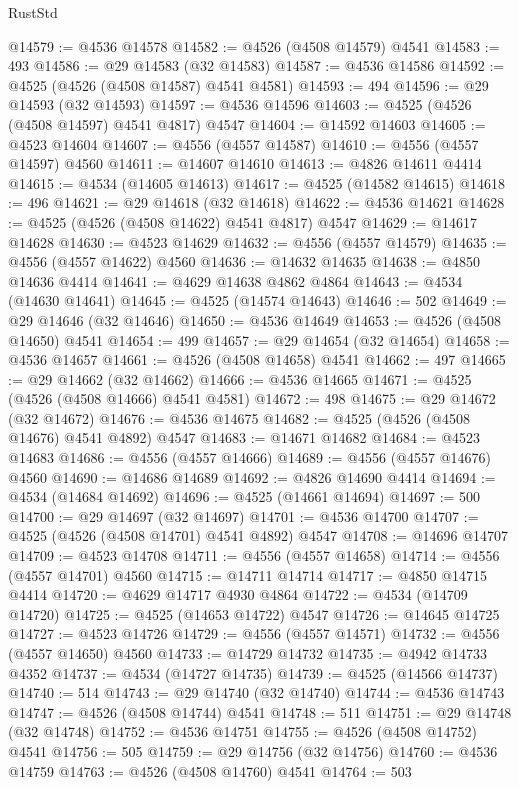 \begin{lexlean}{RustStd}
\begin{coremodule}
@14579 := @4536 @14578
@14582 := @4526 (@4508 @14579) @4541
@14583 := 493
@14586 := @29 @14583 (@32 @14583)
@14587 := @4536 @14586
@14592 := @4525 (@4526 (@4508 @14587) @4541 @4581)
@14593 := 494
@14596 := @29 @14593 (@32 @14593)
@14597 := @4536 @14596
@14603 := @4525 (@4526 (@4508 @14597) @4541 @4817) @4547
@14604 := @14592 @14603
@14605 := @4523 @14604
@14607 := @4556 (@4557 @14587)
@14610 := @4556 (@4557 @14597) @4560
@14611 := @14607 @14610
@14613 := @4826 @14611 @4414
@14615 := @4534 (@14605 @14613)
@14617 := @4525 (@14582 @14615)
@14618 := 496
@14621 := @29 @14618 (@32 @14618)
@14622 := @4536 @14621
@14628 := @4525 (@4526 (@4508 @14622) @4541 @4817) @4547
@14629 := @14617 @14628
@14630 := @4523 @14629
@14632 := @4556 (@4557 @14579)
@14635 := @4556 (@4557 @14622) @4560
@14636 := @14632 @14635
@14638 := @4850 @14636 @4414
@14641 := @4629 @14638 @4862 @4864
@14643 := @4534 (@14630 @14641)
@14645 := @4525 (@14574 @14643)
@14646 := 502
@14649 := @29 @14646 (@32 @14646)
@14650 := @4536 @14649
@14653 := @4526 (@4508 @14650) @4541
@14654 := 499
@14657 := @29 @14654 (@32 @14654)
@14658 := @4536 @14657
@14661 := @4526 (@4508 @14658) @4541
@14662 := 497
@14665 := @29 @14662 (@32 @14662)
@14666 := @4536 @14665
@14671 := @4525 (@4526 (@4508 @14666) @4541 @4581)
@14672 := 498
@14675 := @29 @14672 (@32 @14672)
@14676 := @4536 @14675
@14682 := @4525 (@4526 (@4508 @14676) @4541 @4892) @4547
@14683 := @14671 @14682
@14684 := @4523 @14683
@14686 := @4556 (@4557 @14666)
@14689 := @4556 (@4557 @14676) @4560
@14690 := @14686 @14689
@14692 := @4826 @14690 @4414
@14694 := @4534 (@14684 @14692)
@14696 := @4525 (@14661 @14694)
@14697 := 500
@14700 := @29 @14697 (@32 @14697)
@14701 := @4536 @14700
@14707 := @4525 (@4526 (@4508 @14701) @4541 @4892) @4547
@14708 := @14696 @14707
@14709 := @4523 @14708
@14711 := @4556 (@4557 @14658)
@14714 := @4556 (@4557 @14701) @4560
@14715 := @14711 @14714
@14717 := @4850 @14715 @4414
@14720 := @4629 @14717 @4930 @4864
@14722 := @4534 (@14709 @14720)
@14725 := @4525 (@14653 @14722) @4547
@14726 := @14645 @14725
@14727 := @4523 @14726
@14729 := @4556 (@4557 @14571)
@14732 := @4556 (@4557 @14650) @4560
@14733 := @14729 @14732
@14735 := @4942 @14733 @4352
@14737 := @4534 (@14727 @14735)
@14739 := @4525 (@14566 @14737)
@14740 := 514
@14743 := @29 @14740 (@32 @14740)
@14744 := @4536 @14743
@14747 := @4526 (@4508 @14744) @4541
@14748 := 511
@14751 := @29 @14748 (@32 @14748)
@14752 := @4536 @14751
@14755 := @4526 (@4508 @14752) @4541
@14756 := 505
@14759 := @29 @14756 (@32 @14756)
@14760 := @4536 @14759
@14763 := @4526 (@4508 @14760) @4541
@14764 := 503

\end{coremodule}
\end{lexlean}
